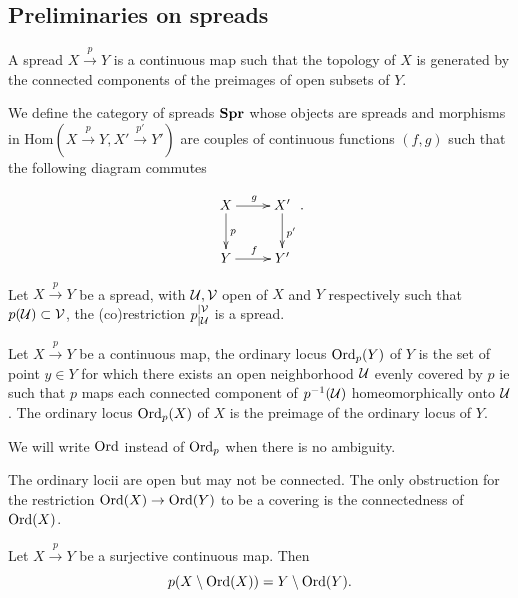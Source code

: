 \subsection{Preliminaries on spreads}\label{sec:spread_base}


\begin{defi}\label{def:category_spreads} A spread $X\xrightarrow{p} Y$ is a continuous map such that the topology of $X$ is generated by the connected components of the preimages of open subsets of $Y$.

We define the category of spreads $\mathbf{Spr}$ whose objects are spreads and morphisms in $\mathrm{Hom}(X\xrightarrow{p} Y, X'\xrightarrow{p'} Y')$ are couples of continuous functions $(f,g)$  such that the following diagram commutes

$$\xymatrix{
X\ar[d]^p \ar[r]^g & X' \ar[d]^{p'} \\ Y \ar[r]^{f} & Y'
}.$$

\end{defi}

\begin{rem}\label{rem:spread_open_respectively_co} Let $X\xrightarrow{p} Y$ be a spread, 
with $\mathcal{U},\mathcal V$ open of $X$  and $Y$ respectively such that $p(\mathcal{U})\subset \mathcal V$, the (co)restriction $p_{|\mathcal{U}}^{|\mathcal V}$ is a spread.
\end{rem}
\begin{defi}\label{def:continuous_map_ordinary_locus}
  Let $X\xrightarrow{p} Y$ be a continuous map, the  ordinary locus $\mathrm{Ord}_p(Y)$ of $Y$  is the set of point $y\in Y$  for which there exists an open neighborhood $\mathcal{U}$ evenly covered by $p$ ie such that $p$ maps each connected component of $p^{-1}(\mathcal{U})$ homeomorphically onto $\mathcal{U}$. The ordinary locus $\mathrm{Ord}_p(X)$ of $X$ is the preimage of the ordinary locus of $Y$.
  
  We will write $\mathrm{Ord}$ instead of $\mathrm{Ord}_p$ when there is no ambiguity.
\end{defi}
\begin{rem}\label{rem:ordinary_locii_open_but}
 The ordinary locii are open but may not be connected. The only obstruction for the restriction $\mathrm{Ord}(X)\rightarrow \mathrm{Ord}(Y)$ to be a covering is the connectedness of $\mathrm{Ord}(X)$.
\end{rem}
\begin{rem}\label{rem:singular_on_singular}
 Let $X\xrightarrow{p}Y$ be a surjective continuous map. Then $$p(X\setminus \mathrm{Ord}(X))  = Y\setminus \mathrm{Ord}(Y).$$
\end{rem}


